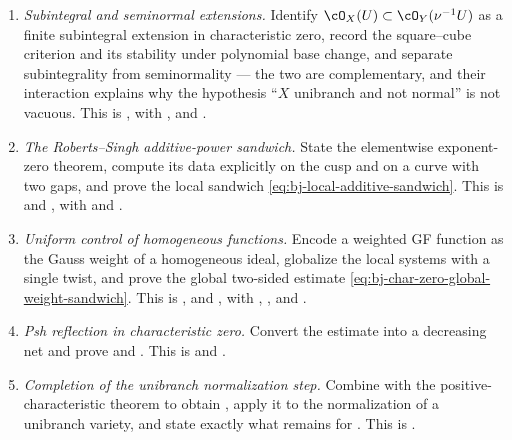 \begin{enumerate}
\item\label{itm:ch44-task:subintegral}
      \emph{Subintegral and seminormal extensions.}  Identify
      $\cO_X(U)\subset\cO_Y(\nu^{-1}U)$ as a finite subintegral extension
      in characteristic zero, record the square--cube criterion and its
      stability under polynomial base change, and separate subintegrality
      from seminormality --- the two are complementary, and their
      interaction explains why the hypothesis ``$X$ unibranch and not
      normal'' is not vacuous.  This is , with
      ,
       and
      .
\item\label{itm:ch44-task:rs}
      \emph{The Roberts--Singh additive-power sandwich.}  State the
      elementwise exponent-zero theorem, compute its data explicitly on the
      cusp and on a curve with two gaps, and prove the local sandwich
      \eqref{eq:bj-local-additive-sandwich}.  This is
       and , with
       and
      .
\item\label{itm:ch44-task:uniform}
      \emph{Uniform control of homogeneous functions.}  Encode a weighted
      GF function as the Gauss weight of a homogeneous ideal, globalize the
      local systems with a single twist, and prove the global two-sided
      estimate \eqref{eq:bj-char-zero-global-weight-sandwich}.  This is
      ,  and
      , with
      , ,
       and
      .
\item\label{itm:ch44-task:reflect}
      \emph{Psh reflection in characteristic zero.}  Convert the estimate
      into a decreasing net and prove
       and
      .  This is
       and .
\item\label{itm:ch44-task:unibranch}
      \emph{Completion of the unibranch normalization step.}  Combine with
      the positive-characteristic theorem to obtain
      , apply it to
      the normalization of a unibranch variety, and state exactly what
      remains for .  This is
      .
\end{enumerate}

